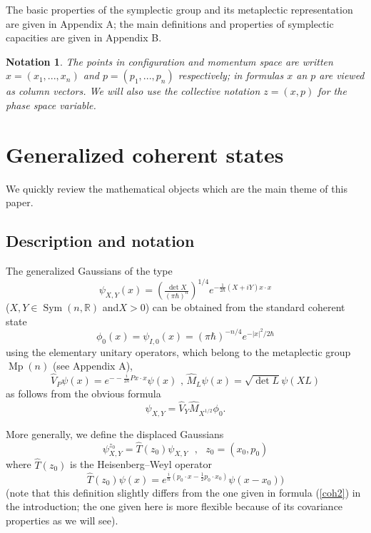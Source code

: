 \documentclass[11pt]{article}%
\newtheorem{notation}[theorem]{Notation}
\begin{document}
The basic properties of the symplectic group and its metaplectic
representation are given in Appendix A; the main definitions and properties of
symplectic capacities are given in Appendix B.

\begin{notation}
The points in configuration and momentum space are written $x=(x_{1}%
,...,x_{n})$ and $p=(p_{1},...,p_{n})$ respectively; in formulas $x$ an $p$
are viewed as column vectors. We will also use the collective notation
$z=(x,p)$ for the phase space variable.
\end{notation}

\section{Generalized coherent states}

We quickly review the mathematical objects which are the main theme of this paper.

\subsection{Description and notation}

The generalized Gaussians of the type
\begin{equation}
\psi_{X,Y}(x)=\left(  \tfrac{\det X}{(\pi\hbar)^{n}}\right)  ^{1/4}%
e^{-\frac{1}{2\hbar}(X+iY)x\cdot x} \label{squeezed}%
\end{equation}
($X,Y\in\operatorname*{Sym}(n,\mathbb{R})$ and$X>0$) can be obtained from the
standard coherent state
\begin{equation}
\phi_{0}(x)=\psi_{I,0}(x)=(\pi\hbar)^{-n/4}e^{-|x|^{2}/2\hbar}
\label{standard}%
\end{equation}
using the elementary unitary operators, which belong to the metaplectic group
$\operatorname*{Mp}(n)$ (see Appendix A),
\begin{equation}
\widehat{V}_{P}\psi(x)=e^{--\frac{i}{2\hbar}Px\cdot x}\psi(x)\text{ \ ,
\ }\widehat{M}_{L}\psi(x)=\sqrt{\det L}\psi(XL) \label{unit}%
\end{equation}
as follows from the obvious formula
\begin{equation}
\psi_{X,Y}=\widehat{V}_{Y}\widehat{M}_{X^{1/2}}\phi_{0}. \label{fixy}%
\end{equation}


More generally, we define the displaced Gaussians
\begin{equation}
\psi_{X,Y}^{z_{0}}=\widehat{T}(z_{0})\psi_{X,Y}\text{ \ \ },\text{ \ \ }%
z_{0}=(x_{0},p_{0}) \label{psitt}%
\end{equation}
where $\widehat{T}(z_{0})$ is the Heisenberg--Weyl operator%
\begin{equation}
\widehat{T}(z_{0})\psi(x)=e^{\frac{i}{\hbar}(p_{0}\cdot x-\frac{1}{2}%
p_{0}\cdot x_{0})}\psi(x-x_{0})) \label{HW}%
\end{equation}
(note that this definition slightly differs from the one given in formula
(\ref{coh2}) in the introduction; the one given here is more flexible because
of its covariance properties as we will see).
\end{document}
